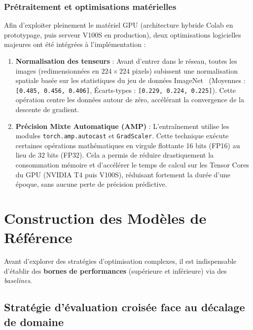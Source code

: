\documentclass[11pt,a4paper,openany]{book}
\begin{document}
\subsection{Prétraitement et optimisations matérielles}

Afin d'exploiter pleinement le matériel GPU (architecture hybride Colab en prototypage, puis serveur V100S en production), deux optimisations logicielles majeures ont été intégrées à l'implémentation :

\begin{enumerate}
    \item \textbf{Normalisation des tenseurs} : Avant d'entrer dans le réseau, toutes les images (redimensionnées en $224 \times 224$ pixels) subissent une normalisation spatiale basée sur les statistiques du jeu de données ImageNet~\cite{imagenet} (Moyennes : \texttt{[0.485, 0.456, 0.406]}, Écarts-types : \texttt{[0.229, 0.224, 0.225]}). Cette opération centre les données autour de zéro, accélérant la convergence de la descente de gradient.
    \item \textbf{Précision Mixte Automatique (AMP)} : L'entraînement utilise les modules \texttt{torch.amp.autocast} et \texttt{GradScaler}. Cette technique exécute certaines opérations mathématiques en virgule flottante 16 bits (FP16) au lieu de 32 bits (FP32). Cela a permis de réduire drastiquement la consommation mémoire et d'accélérer le temps de calcul sur les Tensor Cores du GPU (NVIDIA T4 puis V100S), réduisant fortement la durée d'une époque, sans aucune perte de précision prédictive.
\end{enumerate}

\newpage

\chapter{Construction des Modèles de Référence}

Avant d'explorer des stratégies d'optimisation complexes, il est indispensable d'établir des \textbf{bornes de performances} (supérieure et inférieure) via des \textit{baselines}.

\section{Stratégie d'évaluation croisée face au décalage de domaine}
\end{document}
